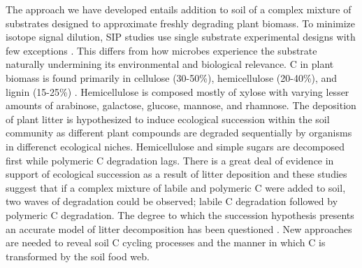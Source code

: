 The approach we have developed entails addition to soil of a complex mixture of substrates designed to approximate freshly degrading plant biomass. To minimize isotope signal dilution, SIP studies use single substrate experimental designs with few exceptions \cite{Lueders_2003,Chauhan_2009}. This differs from how microbes experience the substrate naturally undermining its environmental and biological relevance. C in plant biomass is found primarily in cellulose (30-50\%), hemicellulose (20-40\%), and lignin (15-25\%) \cite{Lynd_2002}. Hemicellulose is composed mostly of xylose with varying lesser amounts of arabinose, galactose, glucose, mannose, and rhamnose. The deposition of plant litter is hypothesized to induce ecological succession within the soil community as different plant compounds are degraded sequentially by organisms in differenct ecological niches. Hemicellulose and simple sugars are decomposed first while polymeric C degradation lags. There is a great deal of evidence in support of ecological succession as a result of litter deposition \cite{GARRETT_1951, Alexander_1964, Engelking_2007, Hu_1997, Anderson_1973, Stotzky_1961, Alden_2001, Furukawa_1996, Fontaine_2003, Blagodatskaya_2007, Jenkins_2010, Rui_2009, Fierer_2010, Gessner_2010} and these studies suggest that if a complex mixture of labile and polymeric C were added to soil, two waves of degradation could be observed; labile C degradation followed by polymeric C degradation. The degree to which the succession hypothesis presents an accurate model of litter decomposition has been questioned \cite{Kj_ller_1982,Frankland_1998,Osono_2005}. New approaches are needed to reveal soil C cycling processes and the manner in which C is transformed by the soil food web.  


